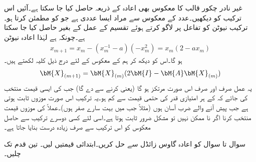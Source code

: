 غیر نادر چکور قالب کا معکوس بھی اعادہ کے ذریعہ حاصل کیا جا سکتا ہے۔آئیں اس ترکیب کو دیکھیں۔عدد  کے معکوس  سے مراد ایسا عددی ہے جو  کو مطمئن کرتا ہو۔ترکیب نیوٹن کو تفاعل  پر لاگو کرتے ہوئے تقسیم کے عمل کے بغیر  حاصل کیا جا سکتا ہے۔چونکہ  ہے لہٰذا اعادہ نیوٹن
\begin{align*}
x_{m+1}=x_m-(x_m^{-1}-a)(-x_m^2)=x_m(2-ax_m)
\end{align*}
ہو گا۔اس کو دیکھ کر ہم  کے معکوس  کے لئے درج ذیل کلیہ لکھتے ہیں۔
\begin{align}\label{مساوات_خطی_اعدادی_مثال_ج}
\bM{X}_{(m+1)}=\bM{X}_{(m)}(2\bM{I}-\bM{A}\bM{X}_{(m)})
\end{align}
یہ عمل صرف اور صرف اس صورت مرتکز ہو گا (یعنی  کرنے سے  دے گا) جب  کی ایسی قیمت منتخب کی جائے کہ  کے ہر امتیازی قدر  کی حتمی قیمت  سے کم ہو۔یہ ترکیب اس صورت موزوں ثابت ہوتی ہے جب پیش آنے والے ضرب آسان ہوں (مثلاً جب  میں بہت سارے صفر ہوں)۔عملاً   کی موزوں قیمت منتخب کرنا اگر نا ممکن نہیں تو مشکل ضرور  ثابت ہوتا ہے۔اسی لئے کسی دوسرے ترکیب سے حاصل معکوس کو اس ترکیب سے صرف زیادہ درست بنایا جاتا ہے۔ 

سوال  تا سوال  کو اعادہ گاوس زائڈل سے حل کریں۔ابتدائی قیمتیں  لیں۔ تین قدم تک چلیں۔

